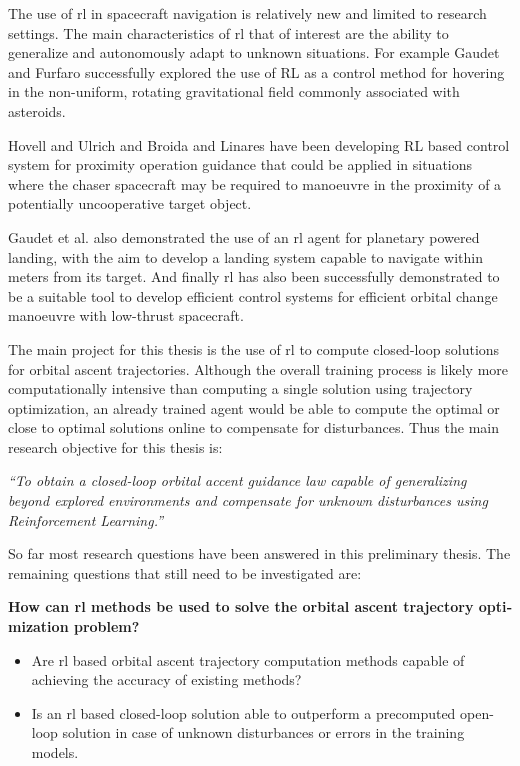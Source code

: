 The use of \acrshort{rl} in spacecraft navigation is relatively new and limited to research settings. The main characteristics of \acrshort{rl} that of interest are the ability to generalize and autonomously adapt to unknown situations. For example Gaudet and Furfaro \cite{gaudet2012robust} successfully explored the use of RL as a control method for hovering in the non-uniform, rotating gravitational field commonly associated with asteroids. 

Hovell and Ulrich \cite{hovell2020deep, hovell2021deep} and Broida and Linares \cite{broida2019spacecraft} have been developing RL based control system for proximity operation guidance that could be applied in situations where the chaser spacecraft may be required to manoeuvre in the proximity of a potentially uncooperative target object.

Gaudet et al. \cite{gaudet2018deep} also demonstrated the use of an \acrshort{rl} agent for planetary powered landing, with the aim to develop a landing system capable to navigate within meters from its target. And finally \acrshort{rl} has also been successfully demonstrated to be a suitable tool to develop efficient control systems for efficient orbital change manoeuvre with low-thrust spacecraft.

The main project for this thesis is the use of \acrshort{rl} to compute closed-loop solutions for orbital ascent trajectories. Although the overall training process is likely more computationally intensive than computing a single solution using trajectory optimization, an already trained agent would be able to compute the optimal or close to optimal solutions online to compensate for disturbances. Thus the main research objective for this thesis is:

\emph{“To obtain a closed-loop orbital accent guidance law capable of generalizing beyond explored environments and compensate for unknown disturbances using Reinforcement Learning.”}

So far most research questions have been answered in this preliminary thesis. The remaining questions that still need to be investigated are:

\textbf{How can \acrlong{rl} methods be used to solve the orbital ascent trajectory opti­mization problem?}
\begin{itemize}
  \item Are \acrshort{rl} based orbital ascent trajectory computation methods capable of achieving the accuracy of existing methods?
  \item Is an \acrshort{rl} based closed-loop solution able to outperform a precomputed open-loop solution in case of unknown disturbances or errors in the training models.
\end{itemize}

